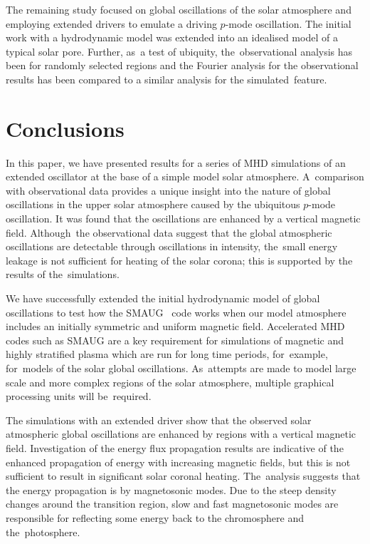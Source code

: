 \documentclass[physics,article,accept,pdftex,moreauthors]{Definitions/mdpi}
\begin{document}
 



The remaining study 
 focused on global oscillations of the solar atmosphere and employing extended drivers to emulate a driving 
{$p$}-mode oscillation. The initial work with a hydrodynamic model was extended into an idealised model of a typical solar pore. Further, as~a test of ubiquity, the~observational analysis has been for randomly selected regions and the Fourier analysis for the observational results has been compared to a similar analysis for the simulated~feature.  








\section{Conclusions}

In this paper, we have presented results for a series of MHD simulations of an extended oscillator at the base of a simple model solar atmosphere. A~comparison with observational data provides a unique insight into the nature of  global oscillations in the upper solar atmosphere caused by the ubiquitous {$p$}-mode oscillation. It was found that the oscillations are enhanced by a vertical magnetic field. Although~the observational data suggest that the global atmospheric oscillations are detectable through oscillations in intensity, the~small energy leakage is not sufficient for heating of the solar corona; this is supported by the results of the~simulations.

We  have successfully extended the initial hydrodynamic model of global oscillations to test how the SMAUG~\cite{Griffiths2015} code works when our model atmosphere includes an initially symmetric and uniform magnetic field. Accelerated MHD codes such as SMAUG are a key requirement for simulations of magnetic and highly stratified plasma which are run for long time periods, for~example, for~models of the solar global oscillations. As~attempts are made to model large scale and more complex regions of the solar atmosphere, multiple graphical processing units will be~required.

The simulations with an extended driver show that the observed  solar atmospheric global oscillations are enhanced by regions with a vertical magnetic field. Investigation of the energy flux propagation results are indicative of the enhanced propagation of energy with increasing magnetic fields, but this is not sufficient to result in significant solar coronal heating. The~analysis suggests that the energy propagation is by magnetosonic modes. Due to the steep density changes around the transition region, slow and fast magnetosonic modes are responsible for reflecting some energy back to the chromosphere and the~photosphere.  
\end{document}

